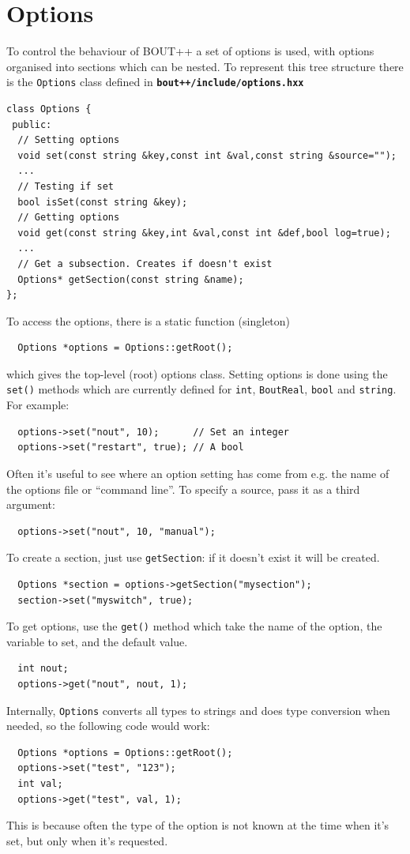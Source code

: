 \documentclass[12pt]{article}
\newcommand{\file}[1]{\texttt{\bf #1}}
\begin{document}
\section{Options}
To control the behaviour of BOUT++ a set of options is used, with
options organised into sections which can be nested. To represent this
tree structure there is the \lstinline!Options! class defined in
\file{bout++/include/options.hxx} 
\begin{lstlisting}
class Options {
 public:
  // Setting options
  void set(const string &key,const int &val,const string &source="");
  ...
  // Testing if set
  bool isSet(const string &key);
  // Getting options
  void get(const string &key,int &val,const int &def,bool log=true);
  ...
  // Get a subsection. Creates if doesn't exist
  Options* getSection(const string &name);
};
\end{lstlisting}

To access the options, there is a static function (singleton)
\begin{lstlisting}
  Options *options = Options::getRoot();
\end{lstlisting}
which gives the top-level (root) options class. Setting options
is done using the \lstinline!set()! methods which are currently
defined for \lstinline!int!, \lstinline!BoutReal!, \lstinline!bool! and
\lstinline!string!. For example:
\begin{lstlisting}
  options->set("nout", 10);      // Set an integer
  options->set("restart", true); // A bool
\end{lstlisting}
Often it's useful to see where an option setting has come from
e.g. the name of the options file or ``command line''. To specify
a source, pass it as a third argument:
\begin{lstlisting}
  options->set("nout", 10, "manual");
\end{lstlisting}
To create a section, just use \lstinline!getSection!: if it doesn't
exist it will be created.
\begin{lstlisting}
  Options *section = options->getSection("mysection");
  section->set("myswitch", true);
\end{lstlisting}

To get options, use the \lstinline!get()! method which take 
the name of the option, the variable to set, and the default value.
\begin{lstlisting}
  int nout;
  options->get("nout", nout, 1);
\end{lstlisting}
Internally, \lstinline!Options! converts all types to strings
and does type conversion when needed, so the following code would work:
\begin{lstlisting}
  Options *options = Options::getRoot();
  options->set("test", "123");
  int val;
  options->get("test", val, 1);
\end{lstlisting}
This is because often the type of the option is not known
at the time when it's set, but only when it's requested.
\end{document}
